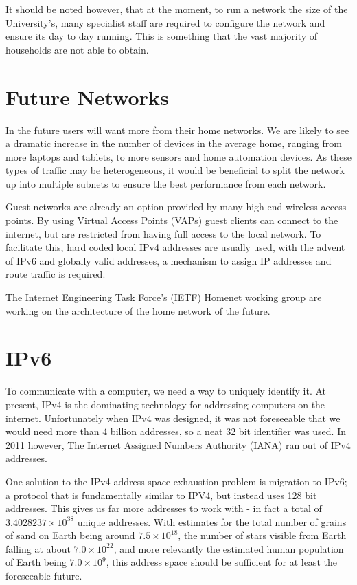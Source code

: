 \documentclass[12pt]{report}
\begin{document}
It should be noted however, that at the moment, to run a network the size of
the University's, many specialist staff are required to configure the network
and ensure its day to day running. This is something that the vast majority of
households are not able to obtain.

\section{Future Networks}
In the future users will want more from their home networks. We are likely to
see a dramatic increase in the number of devices in the average home, ranging
from more laptops and tablets, to more sensors and home automation devices.
As these types of traffic may be heterogeneous, it would be beneficial to split
the network up into multiple subnets to ensure the best performance from each
network. 

Guest networks are already an option provided by many high end wireless access
points. By using Virtual Access Points (VAPs)  guest clients can connect to the internet, but are restricted from
having full access to the local network. To facilitate this, hard coded local
IPv4 addresses are usually used, with the advent of IPv6 and globally valid
addresses, a mechanism to assign IP addresses and route traffic is required. 

The Internet Engineering Task Force's (IETF) Homenet working group
\cite{homenet} are working on the architecture of the home network of the
future. 

\section{IPv6}
To communicate with a computer, we need a way to uniquely identify it. At
present, IPv4 is the dominating technology for addressing computers on the
internet. Unfortunately when IPv4 was designed, it was not foreseeable that we
would need more than 4 billion addresses, so a neat 32 bit identifier was used.
In 2011 however, The Internet Assigned Numbers Authority (IANA)
 ran out of IPv4
addresses. 

One solution to the IPv4 address space exhaustion problem is migration to
IPv6; a protocol that is fundamentally similar to IPV4, but instead uses 128
bit addresses. This gives us far more addresses to work with - in fact a total
of $3.4028237\times10^{38}$ unique addresses. With estimates for the total
number of grains of sand on Earth being around $7.5\times10^{18}$, the number
of stars visible from Earth falling at about $7.0\times10^{22}$, and more
relevantly the estimated human population of Earth being $7.0\times10^{9}$,
this address space should be sufficient for at least the foreseeable future. 
\end{document}

